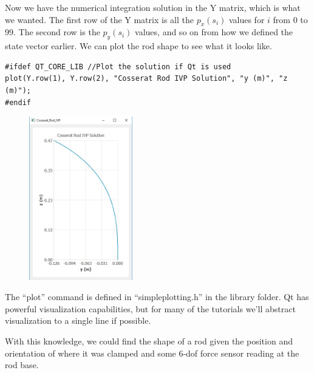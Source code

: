 \documentclass[12pt]{article}
\begin{document}
Now we have the numerical integration solution in the Y matrix, which is what we wanted. The first row of the Y matrix is all the $p_x(s_i)$ values for $i$ from 0 to 99. The second row is the $p_y(s_i)$ values, and so on from how we defined the state vector earlier. We can plot the rod shape to see what it looks like.
\begin{lstlisting}
#ifdef QT_CORE_LIB //Plot the solution if Qt is used
plot(Y.row(1), Y.row(2), "Cosserat Rod IVP Solution", "y (m)", "z (m)");
#endif
\end{lstlisting}
\begin{figure}[h]
	\centering
		\includegraphics[width=0.4\textwidth]{fig/SolutionPlot.jpg}
	\label{fig:SolutionPlot}
\end{figure}
The ``plot'' command is defined in ``simpleplotting.h'' in the library folder. Qt has powerful visualization capabilities, but for many of the tutorials we'll abstract visualization to a single line if possible.

With this knowledge, we could find the shape of a rod given the position and orientation of where it was clamped and some 6-dof force sensor reading at the rod base.
\end{document}
